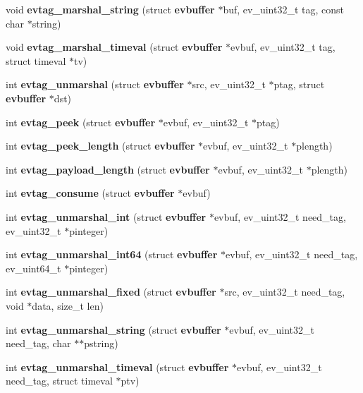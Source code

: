 \begin{DoxyCompactItemize}
\item 
void {\bfseries evtag\-\_\-marshal\-\_\-string} (struct {\bf evbuffer} $\ast$buf, ev\-\_\-uint32\-\_\-t tag, const char $\ast$string)\label{tag_8h_ad8db60a9c4cd8ad2b0edc8faec1daf06}

\item 
void {\bfseries evtag\-\_\-marshal\-\_\-timeval} (struct {\bf evbuffer} $\ast$evbuf, ev\-\_\-uint32\-\_\-t tag, struct timeval $\ast$tv)\label{tag_8h_a1663e1370fab412dc4cb6287e717af9f}

\item 
int {\bfseries evtag\-\_\-unmarshal} (struct {\bf evbuffer} $\ast$src, ev\-\_\-uint32\-\_\-t $\ast$ptag, struct {\bf evbuffer} $\ast$dst)\label{tag_8h_a7344d5755e9125d565dcfd87381f87d9}

\item 
int {\bfseries evtag\-\_\-peek} (struct {\bf evbuffer} $\ast$evbuf, ev\-\_\-uint32\-\_\-t $\ast$ptag)\label{tag_8h_a28430d262e4289fdb1c445e3ceb6f286}

\item 
int {\bfseries evtag\-\_\-peek\-\_\-length} (struct {\bf evbuffer} $\ast$evbuf, ev\-\_\-uint32\-\_\-t $\ast$plength)\label{tag_8h_a8ca004e71e3217bf406be3fd75525caf}

\item 
int {\bfseries evtag\-\_\-payload\-\_\-length} (struct {\bf evbuffer} $\ast$evbuf, ev\-\_\-uint32\-\_\-t $\ast$plength)\label{tag_8h_a76d569ee176b7c225f28ec611254c9da}

\item 
int {\bfseries evtag\-\_\-consume} (struct {\bf evbuffer} $\ast$evbuf)\label{tag_8h_a10c7bbbd8e129138d9f0ef122fae90f2}

\item 
int {\bfseries evtag\-\_\-unmarshal\-\_\-int} (struct {\bf evbuffer} $\ast$evbuf, ev\-\_\-uint32\-\_\-t need\-\_\-tag, ev\-\_\-uint32\-\_\-t $\ast$pinteger)\label{tag_8h_aa73031a48498064b6e64c66495768d86}

\item 
int {\bfseries evtag\-\_\-unmarshal\-\_\-int64} (struct {\bf evbuffer} $\ast$evbuf, ev\-\_\-uint32\-\_\-t need\-\_\-tag, ev\-\_\-uint64\-\_\-t $\ast$pinteger)\label{tag_8h_ad7522ab3b627b8f71f70d295bbcdfccd}

\item 
int {\bfseries evtag\-\_\-unmarshal\-\_\-fixed} (struct {\bf evbuffer} $\ast$src, ev\-\_\-uint32\-\_\-t need\-\_\-tag, void $\ast$data, size\-\_\-t len)\label{tag_8h_a3f7c2d090a5b77291645e39d8f30df2a}

\item 
int {\bfseries evtag\-\_\-unmarshal\-\_\-string} (struct {\bf evbuffer} $\ast$evbuf, ev\-\_\-uint32\-\_\-t need\-\_\-tag, char $\ast$$\ast$pstring)\label{tag_8h_a54d99d6b1369ce129ce12542228ab98f}

\item 
int {\bfseries evtag\-\_\-unmarshal\-\_\-timeval} (struct {\bf evbuffer} $\ast$evbuf, ev\-\_\-uint32\-\_\-t need\-\_\-tag, struct timeval $\ast$ptv)\label{tag_8h_a154e7516c3eefa5e88014c26b863d00e}

\end{DoxyCompactItemize}


